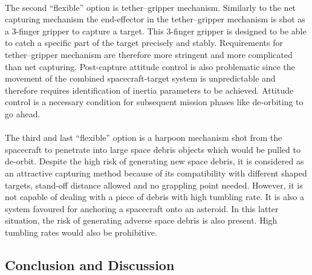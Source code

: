 \paragraph{}The second “flexible” option is tether–gripper mechanism. Similarly to the net capturing mechanism the end-effector in the tether–gripper mechanism is shot as a 3-finger gripper to capture a target. This 3-finger gripper is designed to be able to catch a specific part of the target precisely and stably. Requirements for tether–gripper mechanism are therefore more stringent and more complicated than net capturing. Post-capture attitude control is also problematic since the movement of the combined spacecraft-target system is unpredictable and therefore requires identification of inertia parameters to be achieved. Attitude control is a necessary condition for subsequent mission phases like de-orbiting to go ahead. 
\paragraph{}The third and last “flexible” option is a harpoon mechanism shot from the spacecraft to penetrate into large space debris objects which would be pulled to de-orbit. Despite the high risk of generating new space debris, it is considered as an attractive capturing method because of its compatibility with different shaped targets, stand-off distance allowed and no grappling point needed. However, it is not capable of dealing with a piece of debris with high tumbling rate. It is also a system favoured for anchoring a spacecraft onto an asteroid. In this latter situation, the risk of generating adverse space debris is also present. High tumbling rates would also be prohibitive.
\subsection{Conclusion and Discussion}
